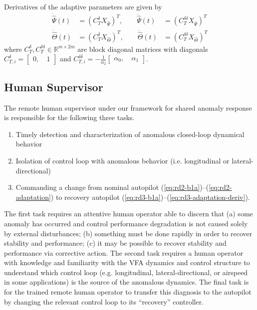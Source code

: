 \documentclass[english]{ifacconf}
\begin{document}
Derivatives of the adaptive parameters are given by
\begin{equation}
\begin{aligned}
	\dot{\hat{\Psi}}(t) &= (C_T^\delta X_{\hat{\Psi}})^T, \qquad \ddot{\hat{\Psi}}(t) &= (C_T^{\delta\delta}X_{\hat{\Psi}})^T \\
	\dot{\hat{\Theta}}(t) &= (C_T^\delta X_{\hat{\Theta}})^T, \qquad \ddot{\hat{\Theta}}(t) &= (C_T^{\delta\delta}X_{\hat{\Theta}})^T
\end{aligned} \label{eq:rd3-adaptation-deriv}
\end{equation}
where $C_T^{\delta}, C_T^{\delta \delta} \in \mathbb{R}^{m \times 2m}$ are block diagonal matrices with diagonals $C_{T,i}^{\delta} = \begin{bmatrix} 0,~ & 1	\end{bmatrix}$ and $C_{T,i}^{\delta\delta} = -\frac{1}{\alpha_2}\begin{bmatrix} \alpha_0,~ & \alpha_1 \end{bmatrix}$. 

\subsection{Human Supervisor}\label{subsec:sc_human}
The remote human supervisor under our framework for shared anomaly response is responsible for the following three tasks.
\begin{enumerate}
	\item Timely detection and characterization of anomalous closed-loop dynamical behavior
	\item Isolation of control loop with anomalous behavior (i.e. longitudinal or lateral-directional)
	\item Commanding a change from nominal autopilot (\ref{eq:rd2-b1a})--(\ref{eq:rd2-adaptation}) to recovery autopilot (\ref{eq:rd3-b1a})--(\ref{eq:rd3-adaptation-deriv}).
\end{enumerate}

The first task requires an attentive human operator able to discern that (a) some anomaly has occurred and control performance degradation is not caused solely by external disturbances; (b) something must be done rapidly in order to recover stability and performance; (c) it may be possible to recover stability and performance via corrective action. The second task requires a human operator with knowledge and familiarity with the VFA dynamics and control structure to understand which control loop (e.g. longitudinal, lateral-directional, or airspeed in some applications) is the source of the anomalous dynamics. The final task is for the trained remote human operator to transfer this diagnosis to the autopilot by changing the relevant control loop to its ``recovery'' controller.
\end{document}
